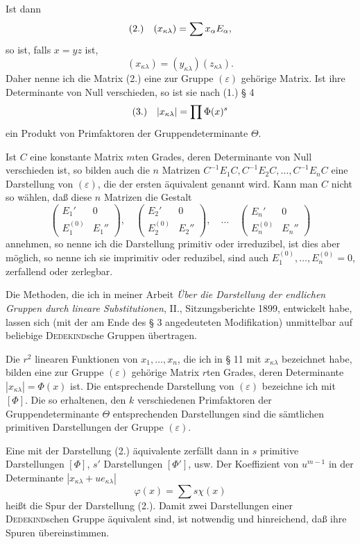 \documentclass[11pt]{article}
\newcommand{\eps}{\varepsilon}
\newcommand{\fnum}[1]{\textup{(\ensuremath{#1}.)}\quad}
\begin{document}
Ist dann
\[
\fnum{2} (x_{\kappa\lambda})=\sum x_\alpha E_\alpha,
\]
so ist, falls $x=yz$ ist,
\[
 (x_{\kappa\lambda})=(y_{\kappa\lambda})(z_{\kappa\lambda}).
\]
Daher nenne ich die Matrix (2.) eine zur Gruppe $(\eps)$ gehörige Matrix. Ist ihre Determinante von Null verschieden, so ist sie nach (1.) § 4
\[
\fnum{3} |x_{\kappa\lambda}|=\prod\Phi(x)^s
\]
ein Produkt von Primfaktoren der Gruppendeterminante $\Theta$.

Ist $C$ eine konstante Matrix $m$ten Grades, deren Determinante von Null verschieden ist, so bilden auch die $n$ Matrizen $C^{-1}E_1C,C^{-1}E_2C,\ldots,C^{-1}E_nC$ eine Darstellung von $(\eps)$, die der ersten äquivalent genannt wird. Kann man $C$ nicht so wählen, daß diese $n$ Matrizen die Gestalt
\[
 \begin{pmatrix}E_1'&0\\ E_1^{(0)}&E_1''\end{pmatrix},
 \quad
 \begin{pmatrix}E_2'&0\\ E_2^{(0)}&E_2''\end{pmatrix},
 \quad \ldots \quad
 \begin{pmatrix}E_n'&0\\ E_n^{(0)}&E_n''\end{pmatrix}
\]
annehmen, so nenne ich die Darstellung primitiv oder irreduzibel, ist dies aber möglich, so nenne ich sie imprimitiv oder reduzibel, sind auch $E_1^{(0)},\ldots,E_n^{(0)}=0$, zerfallend oder zerlegbar.

Die Methoden, die ich in meiner Arbeit \emph{Über die Darstellung der endlichen Gruppen durch lineare Substitutionen}, II., Sitzungsberichte 1899, entwickelt habe, lassen sich (mit der am Ende des § 3 angedeuteten Modifikation) unmittelbar auf beliebige \textsc{Dedekind}sche Gruppen übertragen.

Die $r^2$ linearen Funktionen von $x_1,\ldots,x_n$, die ich in § 11 mit $x_{\kappa\lambda}$ bezeichnet habe, bilden eine zur Gruppe $(\eps)$ gehörige Matrix $r$ten Grades, deren Determinante $|x_{\kappa\lambda}|=\Phi(x)$ ist. Die entsprechende Darstellung von $(\eps)$ bezeichne ich mit $[\Phi]$. Die so erhaltenen, den $k$ verschiedenen Primfaktoren der Gruppendeterminante $\Theta$ entsprechenden Darstellungen sind die sämtlichen primitiven Darstellungen der Gruppe $(\eps)$.

Eine mit der Darstellung (2.) äquivalente zerfällt dann in $s$ primitive Darstellungen $[\Phi]$, $s'$ Darstellungen $[\Phi']$, usw. Der Koeffizient von $u^{m-1}$ in der Determinante $|x_{\kappa\lambda}+ue_{\kappa\lambda}|$
\[
 \varphi(x)=\sum s\chi(x)
\]
heißt die Spur der Darstellung (2.). Damit zwei Darstellungen einer \textsc{Dedekind}schen Gruppe äquivalent sind, ist notwendig und hinreichend, daß ihre Spuren übereinstimmen.
\end{document}
